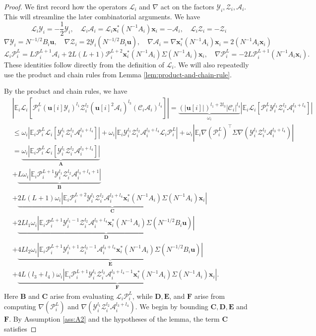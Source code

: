 \documentclass[11pt,reqno]{amsart}
\def\u{\mathbf{u}}
\def\x{\mathbf{x}}
\def\E{\mathbb{E}}
\def\cA{\mathcal{A}}
\def\cY{\mathcal{Y}}
\def\cZ{\mathcal{Z}}
\def\cP{\mathcal{P}}
\def\cC{\mathcal{C}}
\def\cL{\mathcal{L}}
\theoremstyle{definition}
\numberwithin{equation}{section}
\numberwithin{figure}{section}
\begin{document}
\begin{proof}
We first record how the operators $\cL_i$ and $\nabla$ act on the factors $\cY_i,\cZ_i,\cA_i$. This will streamline the later combinatorial arguments. We have
\[
    \cL_i\cY_i=-\frac{1}{2}\cY_i,\quad \cL_i\cA_i=\cL_i\x_i^*(N^{-1}A_i)\x_i=-\cA_i,\quad \cL_i\cZ_i=-\cZ_i
\]
\[
    \nabla\cY_i=N^{-1/2}B_i\u,\quad \nabla\cZ_i=2\cY_i(N^{-1/2}B_i\u),\quad \nabla\cA_i=\nabla\x_i^*(N^{-1}A_i)\x_i=2(N^{-1}A_i\x_i)
\]
\[
    \cL_i\cP_i^L=L\cP_i^{L+1}\cA_i+2L(L+1)\cP_i^{L+2}\x_i^*(N^{-1}A_i)\Sigma(N^{-1}A_i)\x_i,\quad \nabla\cP_i^L=-2L\cP_i^{L+1}(N^{-1}A_i\x_i).
\]
These identities follow directly from the definition of $\cL_i$. We will also repeatedly use the product and chain rules from Lemma \ref{lem:product-and-chain-rule}.

By the product and chain rules, we have
\begin{align*}
    &|\E_i\cL_i[\cP_i^L(\u[i]\cY_i)^{l_1}\cZ_i^{l_2}(\u[i]^2\cA_i)^{l_3}(\cC_i\cA_i)^{l_4}]|=\underbrace{(|\u[i]|)^{l_1+2l_3}|\cC_i|^{l_4}}_{\omega_i}|\E_i\cL_i[\cP_i^L\cY_i^{l_1}\cZ_i^{l_2}\cA_i^{l_3+l_4}]|\\
    &\leq\omega_i|\E_i\cP_i^L\cL_i[\cY_i^{l_1}\cZ_i^{l_2}\cA_i^{l_3+l_4}]|+\omega_i|\E_i\cY_i^{l_1}\cZ_i^{l_2}\cA_i^{l_3+l_4}\cL_i\cP_i^L|+\omega_i|\E_i\nabla(\cP_i^L)^\top\Sigma\nabla(\cY_i^{l_1}\cZ_i^{l_2}\cA_i^{l_3+l_4})|\\
    &=\underbrace{\omega_i|\E_i\cP_i^L\cL_i[\cY_i^{l_1}\cZ_i^{l_2}\cA_i^{l_3+l_4}]|}_{\mathbf{A}}\\
    &+\underbrace{L\omega_i|\E_i\cP_i^{L+1}\cY_i^{l_1}\cZ_i^{l_2}\cA_i^{l_3+l_4+1}|}_\mathbf{B}\\
    &+\underbrace{2L(L+1)\omega_i|\E_i\cP_i^{L+2}\cY_i^{l_1}\cZ_i^{l_2}\cA_i^{l_3+l_4}\x_i^*(N^{-1}A_i)\Sigma(N^{-1}A_i)\x_i|}_{\mathbf{C}}\\
    &+\underbrace{2Ll_1\omega_i|\E_i\cP_i^{L+1}\cY_i^{l_1-1}\cZ_i^{l_2}\cA_i^{l_3+l_4}\x_i^*(N^{-1}A_i)\Sigma(N^{-1/2}B_i\u)|}_{\mathbf{D}}\\
    &+\underbrace{4Ll_2\omega_i|\E_i\cP_i^{L+1}\cY_i^{l_1+1}\cZ_i^{l_2-1}\cA_i^{l_3+l_4}\x_i^*(N^{-1}A_i)\Sigma(N^{-1/2}B_i\u)|}_{\mathbf{E}}\\
    &+\underbrace{4L(l_3+l_4)\omega_i|\E_i\cP_i^{L+1}\cY_i^{l_1}\cZ_i^{l_2}\cA_i^{l_3+l_4-1}\x_i^*(N^{-1}A_i)\Sigma(N^{-1}A_i)\x_i|}_{\mathbf{F}}.
\end{align*}
Here $\mathbf{B}$ and $\mathbf{C}$ arise from evaluating $\cL_i\cP_i^L$, while $\mathbf{D},\mathbf{E}$, and $\mathbf{F}$ arise from computing $\nabla(\cP_i^L)$ and $\nabla(\cY_i^{l_1}\cZ_i^{l_2}\cA_i^{l_3+l_4})$. We begin by bounding $\mathbf{C,D,E}$ and $\mathbf{F}$. By Assumption \ref{ass:A2} and the hypotheses of the lemma, the term $\mathbf{C}$ satisfies

\end{proof}
\end{document}
